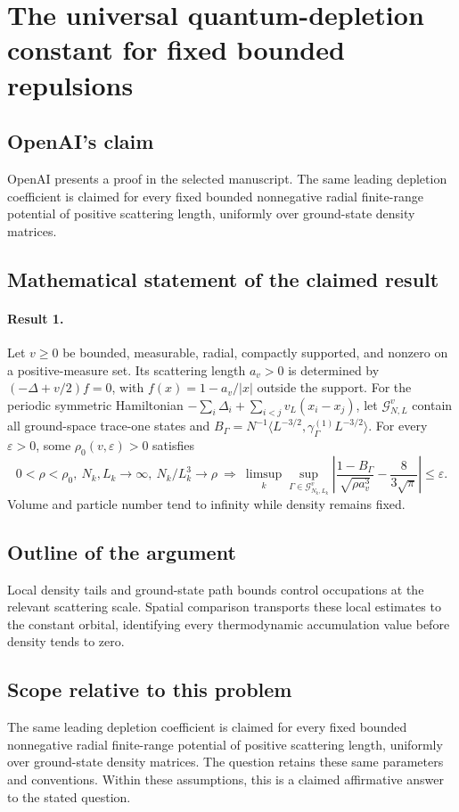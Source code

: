 \documentclass[11pt]{article}
\begin{document}
\section*{The universal quantum-depletion constant for fixed bounded repulsions}

\subsection{OpenAI's claim}
OpenAI presents a proof in the selected manuscript. The same leading depletion coefficient is claimed for every fixed bounded nonnegative radial finite-range potential of positive scattering length, uniformly over ground-state density matrices.

\subsection{Mathematical statement of the claimed result}
\paragraph{Result 1.} Let \(v\ge0\) be bounded, measurable, radial, compactly supported, and nonzero on a positive-measure set. Its scattering length \(a_v>0\) is determined by \((-\Delta+v/2)f=0\), with \(f(x)=1-a_v/|x|\) outside the support. For the periodic symmetric Hamiltonian \(-\sum_i\Delta_i+\sum_{i<j}v_L(x_i-x_j)\), let \(\mathcal G^v_{N,L}\) contain all ground-space trace-one states and \(B_\Gamma=N^{-1}\langle L^{-3/2},\gamma^{(1)}_\Gamma L^{-3/2}\rangle\). For every \(\varepsilon>0\), some \(\rho_0(v,\varepsilon)>0\) satisfies
\[
 0<\rho<\rho_0,\ N_k,L_k\to\infty,\ N_k/L_k^3\to\rho
 \ \Longrightarrow\
 \limsup_k\sup_{\Gamma\in\mathcal G^v_{N_k,L_k}}
 \left|\frac{1-B_\Gamma}{\sqrt{\rho a_v^3}}-\frac8{3\sqrt\pi}\right|\le\varepsilon.
\]
Volume and particle number tend to infinity while density remains fixed.

\subsection{Outline of the argument}
Local density tails and ground-state path bounds control occupations at the relevant scattering scale. Spatial comparison transports these local estimates to the constant orbital, identifying every thermodynamic accumulation value before density tends to zero.

\subsection{Scope relative to this problem}
The same leading depletion coefficient is claimed for every fixed bounded nonnegative radial finite-range potential of positive scattering length, uniformly over ground-state density matrices. The question retains these same parameters and conventions. Within these assumptions, this is a claimed affirmative answer to the stated question.
\end{document}
